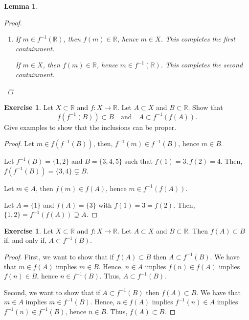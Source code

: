 \documentclass[11pt]{article}
\newcommand{\bbR}{\mathbb{R}}
\providecommand{\arr}{\to}
\providecommand{\sm}{\setminus}
\renewcommand{\_}[1]{\underline{ #1 }}
\newtheorem{lemma}[theorem]{Lemma}
\theoremstyle{definition}
\newtheorem{exercise}[theorem]{Exercise}
\numberwithin{equation}{subsection}
\begin{document}
\begin{lemma}
\begin{proof}
\begin{enumerate}
If $m \in f^{-1}(A) \sm f^{-1}(B)$, then $m\in f^{-1}(A), m\notin f^{-1}(B)$. Hence, $f(m) \in A, f(m) \notin B$. Hence, $f(m) \in A \sm B$, hence $m\in f^{-1}(A \sm B)$. This completes the second containment.

\item If $m \in f^{-1}(\bbR)$, then $f(m) \in \bbR$, hence $m \in X$. This completes the first containment.

If $m \in X$, then $f(m) \in \bbR$, hence $m \in f^{-1}(\bbR)$. This completes the second containment.
    
\end{enumerate}
 


\renewcommand\qedsymbol{QED}
\end{proof}
\end{lemma}


\begin{exercise} 

Let $X\subset \bbR$ and  $f\colon X\arr \bbR$. Let $A\subset X$ and $B\subset \bbR$. Show that
\[
f(f^{-1}(B))\subset B\quad\text{and}\quad A\subset f^{-1}(f(A)).
\]
Give examples to show that the inclusions can be proper.
\begin{proof}
Let $m \in f(f^{-1}(B))$, then, $f^{-1}(m) \in f^{-1}(B)$, hence $m \in B$. 

Let $f^{-1}(B)=\{1,2\}$ and $B = \{3,4,5\}$ such that $f(1)=3, f(2)=4$. Then, $f(f^{-1}(B))= \{3,4\} \subsetneq B$.

Let $m \in A$, then $f(m) \in f(A)$, hence $m \in f^{-1}(f(A))$. 

Let $A=\{1\}$ and $f(A)=\{3\}$ with $f(1)=3=f(2)$. Then, $\{1,2\} = f^{-1}(f(A)) \supsetneq A$. 

\renewcommand\qedsymbol{QED}
\end{proof}
\end{exercise}

\begin{exercise} Let $X\subset \bbR$ and $f:X\longrightarrow \bbR.$ Let $A\subset X$ and $B\subset \bbR.$ Then $f(A)\subset B$ if, and only if, $A \subset f^{-1}(B).$ 
\begin{proof}
First, we want to show that if $f(A)\subset B$ then $A \subset f^{-1}(B).$ We have that $m \in f(A)$ implies $m \in B$. Hence, $n \in A$ implies $f(n) \in f(A)$ implies $f(n) \in B$, hence $n \in f^{-1}(B).$ Thus, $A \subset f^{-1}(B).$

Second, we want to show that if $A \subset f^{-1}(B)$ then $f(A)\subset B$. We have that $m \in A$ implies $m \in f^{-1}(B)$. Hence, $n \in f(A)$ implies $f^{-1}(n) \in A$ implies $f^{-1}(n) \in f^{-1}(B)$, hence $n \in B$. Thus, $f(A)\subset B$.

\renewcommand\qedsymbol{QED}
\end{proof}

\end{exercise} 
\end{document}
